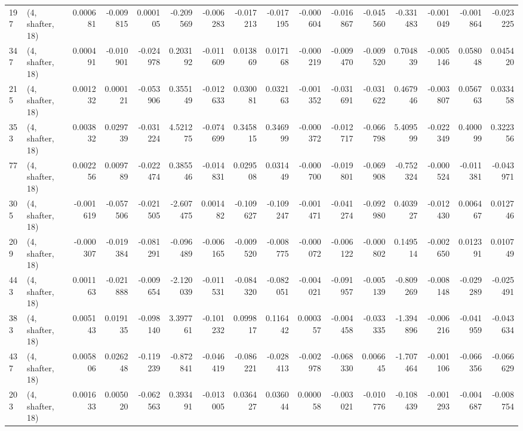 \begin{tabular}{llrrrrrrrrrrrrrr}
197 &  (4, shafter, 18) &   0.000681 & -0.009815 &  0.000105 &   -0.209569 & -0.006283 &  -0.017213 & -0.017195 & -0.000604 & -0.016867 & -0.045560 &    -0.331483 & -0.001049 & -0.001864 & -0.023225 \\
347 &  (4, shafter, 18) &   0.000491 & -0.010901 & -0.024978 &    0.203192 & -0.011609 &   0.013869 &  0.017168 & -0.000219 & -0.009470 & -0.009520 &     0.704839 & -0.005146 &  0.058048 &  0.045420 \\
215 &  (4, shafter, 18) &   0.001232 &  0.000121 & -0.053906 &    0.355149 & -0.012633 &   0.030081 &  0.032163 & -0.001352 & -0.031691 & -0.031622 &     0.467946 & -0.003807 &  0.056763 &  0.033458 \\
353 &  (4, shafter, 18) &   0.003832 &  0.029739 & -0.031224 &    4.521275 & -0.074699 &   0.345815 &  0.346999 & -0.000372 & -0.012717 & -0.066798 &     5.409599 & -0.022349 &  0.400099 &  0.322356 \\
77  &  (4, shafter, 18) &   0.002256 &  0.009789 & -0.022474 &    0.385546 & -0.014831 &   0.029508 &  0.031449 & -0.000700 & -0.019801 & -0.069908 &    -0.752324 & -0.000524 & -0.011381 & -0.043971 \\
305 &  (4, shafter, 18) &  -0.001619 & -0.057506 & -0.021505 &   -2.607475 &  0.001482 &  -0.109627 & -0.109247 & -0.001471 & -0.041274 & -0.092980 &     0.403927 & -0.012430 &  0.006467 &  0.012746 \\
209 &  (4, shafter, 18) &  -0.000307 & -0.019384 & -0.081291 &   -0.096489 & -0.006165 &  -0.009520 & -0.008775 & -0.000072 & -0.006122 & -0.000802 &     0.149514 & -0.002650 &  0.012391 &  0.010749 \\
443 &  (4, shafter, 18) &   0.001163 & -0.021888 & -0.009654 &   -2.120039 & -0.011531 &  -0.084320 & -0.082051 & -0.004021 & -0.091957 & -0.005139 &    -0.809269 & -0.008148 & -0.029289 & -0.025491 \\
383 &  (4, shafter, 18) &   0.005143 &  0.019135 & -0.098140 &    3.397761 & -0.101232 &   0.099817 &  0.116442 &  0.000357 & -0.004458 & -0.033335 &    -1.394896 & -0.006216 & -0.041959 & -0.043634 \\
437 &  (4, shafter, 18) &   0.005806 &  0.026248 & -0.119239 &   -0.872841 & -0.046419 &  -0.086221 & -0.028413 & -0.002978 & -0.068330 &  0.006645 &    -1.707464 & -0.001106 & -0.066356 & -0.066629 \\
203 &  (4, shafter, 18) &   0.001633 &  0.005020 & -0.062563 &    0.393491 & -0.013005 &   0.036427 &  0.036044 &  0.000058 & -0.003021 & -0.010776 &    -0.108439 & -0.001293 & -0.004687 & -0.008754 \\

\end{tabular}
